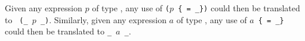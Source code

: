 Given any expression $p$ of type \Person, any use of {\tt ($p$
  \{\id\ = \new\_\id\})} could then be translated to {\tt
  (\update\_\id\ $p$ \new\_\id)}.  Similarly, given any expression $a$
of type \Address, any use of {\tt $a\!$ \{\id\ = \new\_\id\}} could
then be translated to {\tt \update\_\id\ $a$ \new\_\id}.

